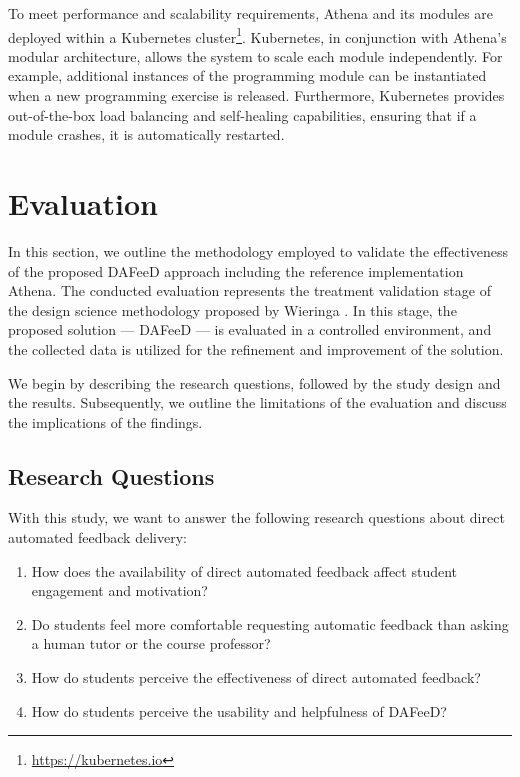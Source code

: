 \documentclass[manuscript,screen,review]{acmart}
\begin{document}
To meet performance and scalability requirements, Athena and its modules are deployed within a Kubernetes cluster\footnote{\url{https://kubernetes.io}}.
Kubernetes, in conjunction with Athena's modular architecture, allows the system to scale each module independently.
For example, additional instances of the programming module can be instantiated when a new programming exercise is released.
Furthermore, Kubernetes provides out-of-the-box load balancing and self-healing capabilities, ensuring that if a module crashes, it is automatically restarted.


\section{Evaluation} %
\label{sec:evaluation}

In this section, we outline the methodology employed to validate the effectiveness of the proposed DAFeeD approach including the reference implementation Athena.
The conducted evaluation represents the treatment validation stage of the design science methodology proposed by Wieringa \cite{wieringa:2014:DesignScienceMethodologya}.
In this stage, the proposed solution — DAFeeD — is evaluated in a controlled environment, and the collected data is utilized for the refinement and improvement of the solution.

We begin by describing the research questions, followed by the study design and the results.
Subsequently, we outline the limitations of the evaluation and discuss the implications of the findings.


\subsection{Research Questions}

With this study, we want to answer the following research questions about direct automated feedback delivery:

\begin{enumerate}[label=\textbf{RQ\arabic*}]
  \item How does the availability of direct automated feedback affect student engagement and motivation? 
  \item Do students feel more comfortable requesting automatic feedback than asking a human tutor or the course professor?
  \item How do students perceive the effectiveness of direct automated feedback?
  \item How do students perceive the usability and helpfulness of DAFeeD?
\end{enumerate}
\end{document}
